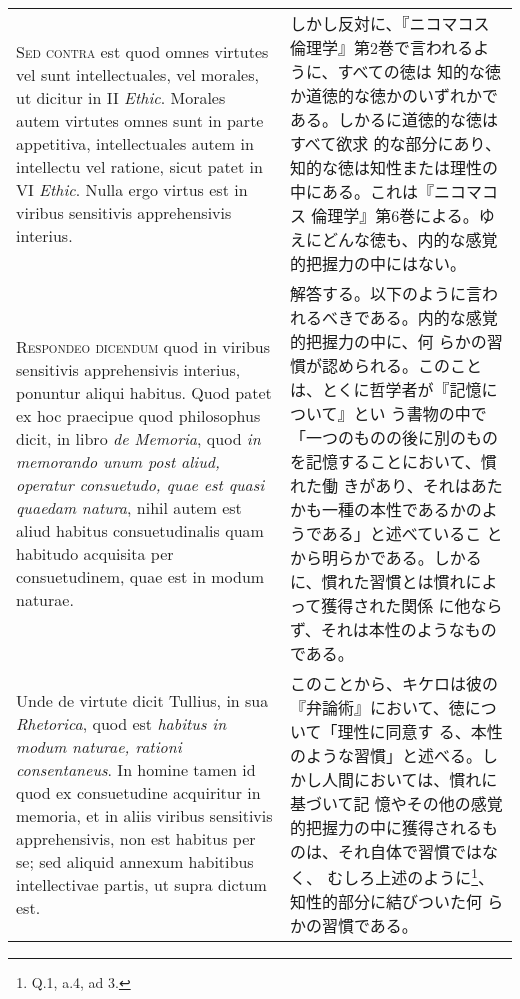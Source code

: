 \documentclass[10pt]{jsarticle}
\begin{document}
\begin{longtable}{p{21em}p{21em}}
{\scshape Sed contra} est quod omnes virtutes vel sunt intellectuales,
vel morales, ut dicitur in II {\itshape Ethic}. Morales autem virtutes
omnes sunt in parte appetitiva, intellectuales autem in intellectu vel
ratione, sicut patet in VI {\itshape Ethic}. Nulla ergo virtus est in
viribus sensitivis apprehensivis interius.

&

しかし反対に、『ニコマコス倫理学』第2巻で言われるように、すべての徳は
知的な徳か道徳的な徳かのいずれかである。しかるに道徳的な徳はすべて欲求
的な部分にあり、知的な徳は知性または理性の中にある。これは『ニコマコス
倫理学』第6巻による。ゆえにどんな徳も、内的な感覚的把握力の中にはない。
 
\\



 {\scshape Respondeo dicendum} quod in viribus sensitivis
 apprehensivis interius, ponuntur aliqui habitus. Quod patet ex hoc
 praecipue quod philosophus dicit, in libro {\itshape de Memoria},
 quod {\itshape in memorando unum post aliud, operatur consuetudo,
 quae est quasi quaedam natura}, nihil autem est aliud habitus
 consuetudinalis quam habitudo acquisita per consuetudinem, quae est
 in modum naturae.

 &

解答する。以下のように言われるべきである。内的な感覚的把握力の中に、何
らかの習慣が認められる。このことは、とくに哲学者が『記憶について』とい
う書物の中で「一つのものの後に別のものを記憶することにおいて、慣れた働
きがあり、それはあたかも一種の本性であるかのようである」と述べているこ
とから明らかである。しかるに、慣れた習慣とは慣れによって獲得された関係
に他ならず、それは本性のようなものである。
 
 \\
 
 
 Unde de virtute dicit Tullius, in sua {\itshape Rhetorica}, quod est
 {\itshape habitus in modum naturae, rationi consentaneus}. In homine
 tamen id quod ex consuetudine acquiritur in memoria, et in aliis
 viribus sensitivis apprehensivis, non est habitus per se; sed aliquid
 annexum habitibus intellectivae partis, ut supra dictum est.

 &

このことから、キケロは彼の『弁論術』において、徳について「理性に同意す
る、本性のような習慣」と述べる。しかし人間においては、慣れに基づいて記
憶やその他の感覚的把握力の中に獲得されるものは、それ自体で習慣ではなく、
むしろ上述のように\footnote{Q.1, a.4, ad 3.}、知性的部分に結びついた何
らかの習慣である。
 

\end{longtable}
\end{document}
